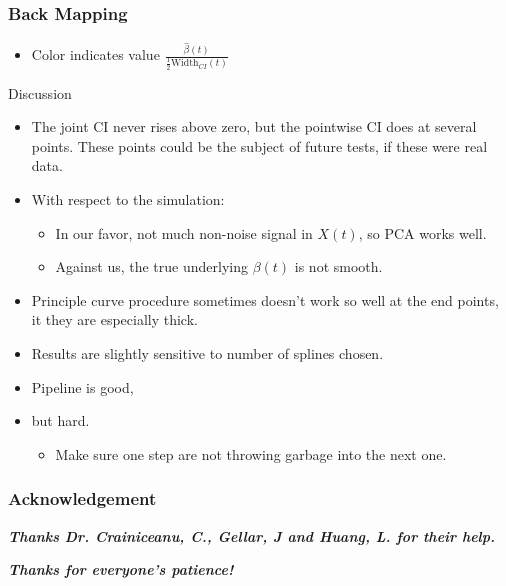 \documentclass[9 pt]{beamer}
\newcommand{\bi}{\begin{itemize}}
\newcommand{\ei}{\end{itemize}}
\newcommand{\ilist}[1]{\bi \item #1 \ei}
\begin{document}
\begin{frame}
\frametitle{Back Mapping}
\begin{figure}[ht]
\centering
{}
\end{figure}
\begin{itemize}
\item<2-| alert@2> Color indicates value $\frac{\hat{\beta}(t)}{\frac{1}{2}\text{Width}_{CI}(t)}$
\end{itemize}
\end{frame}
\begin{frame}{Discussion}
\bi
\item<1-| alert@1> The joint CI never rises above zero, but the pointwise CI does at several points. These points could be the subject of future tests, if these were real data. \vspace{.4cm}

\item<2-| alert@2> With respect to the simulation:
\ilist{In our favor, not much non-noise signal in $X(t)$, so PCA works well.}
\ilist{Against us, the true underlying $\beta(t)$ is not smooth.}
\item<3-| alert@3> Principle curve procedure sometimes doesn't work so well at the end points, it they are especially thick.
\item<3-| alert@3> Results are slightly sensitive to number of splines chosen.
\item<4-| alert@4> Pipeline is good,
\item<5-| alert@5> but hard. \ilist{Make sure one step are not throwing garbage into the next one.}
\ei
\end{frame}

\begin{frame}
\frametitle{Acknowledgement}
{\bf\it Thanks Dr. Crainiceanu, C., Gellar, J and Huang, L. for their help.}\
\smallskip

{\bf\it Thanks for everyone's patience!}
\end{frame}
\end{document}
